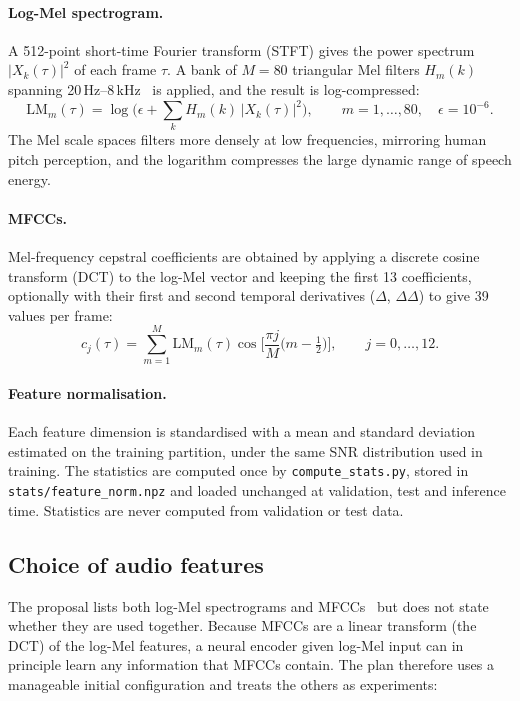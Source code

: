 \paragraph{Log-Mel spectrogram.} A 512-point short-time Fourier transform
(STFT) gives the power spectrum $|X_k(\tau)|^2$ of each frame $\tau$. A bank of
$M=80$ triangular Mel filters $H_m(k)$ spanning 20\,Hz--8\,kHz \rec\ is applied,
and the result is log-compressed:
\begin{equation}
\mathrm{LM}_m(\tau) = \log\!\Big(\epsilon + \sum_{k} H_m(k)\,|X_k(\tau)|^2\Big),
\qquad m = 1,\dots,80,\quad \epsilon = 10^{-6}.
\label{eq:logmel}
\end{equation}
The Mel scale spaces filters more densely at low frequencies, mirroring human
pitch perception, and the logarithm compresses the large dynamic range of
speech energy.

\paragraph{MFCCs.} Mel-frequency cepstral coefficients are obtained by applying a
discrete cosine transform (DCT) to the log-Mel vector and keeping the first 13
coefficients, optionally with their first and second temporal derivatives
($\Delta$, $\Delta\Delta$) to give 39 values per frame:
\begin{equation}
c_j(\tau) = \sum_{m=1}^{M} \mathrm{LM}_m(\tau)\cos\!\Big[\frac{\pi j}{M}\Big(m-\tfrac12\Big)\Big],
\qquad j = 0,\dots,12.
\end{equation}

\paragraph{Feature normalisation.} Each feature dimension is standardised with a
mean and standard deviation estimated on the training partition, under the same
SNR distribution used in training. The statistics are computed once by
\texttt{compute\_stats.py}, stored in \texttt{stats/feature\_norm.npz} and
loaded unchanged at validation, test and inference time. Statistics are never
computed from validation or test data.

\subsection{Choice of audio features}
The proposal lists both log-Mel spectrograms and MFCCs \spec\ but does not
state whether they are used together. Because MFCCs are a linear transform
(the DCT) of the log-Mel features, a neural encoder given log-Mel input can in
principle learn any information that MFCCs contain. The plan therefore uses a
manageable initial configuration and treats the others as experiments:

